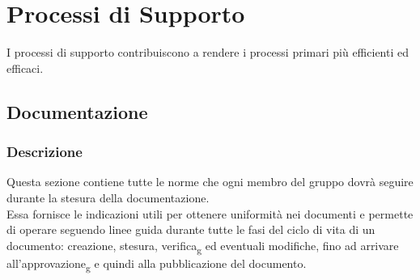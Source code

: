 \section{Processi di Supporto}
I processi di supporto contribuiscono a rendere i processi primari più
efficienti ed efficaci.

\subsection{Documentazione}
\subsubsection{Descrizione}
Questa sezione contiene tutte le norme che ogni membro del gruppo dovrà seguire
durante la stesura della documentazione. \\Essa fornisce le indicazioni utili per
ottenere uniformità nei documenti e permette di operare seguendo linee guida
durante tutte le fasi del ciclo di vita di un documento: creazione, stesura,
verifica\textsubscript{g} ed eventuali modifiche, fino ad arrivare
all'approvazione\textsubscript{g} e quindi alla pubblicazione del documento.

